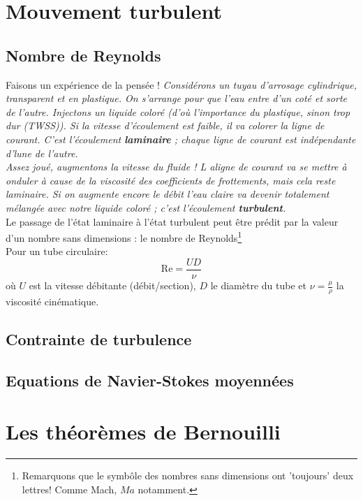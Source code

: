 \section{Mouvement turbulent}
	\subsection{Nombre de Reynolds}
	Faisons un expérience de la pensée ! \textit{Considérons un tuyau d'arrosage cylindrique,
	transparent et en plastique. On s'arrange pour que l'eau entre d'un coté et sorte de l'autre.
	Injectons un liquide coloré (d'où l'importance du plastique, sinon trop dur (TWSS)). Si la
	vitesse d'écoulement est faible, il va colorer la ligne de courant. C'est l'écoulement 
	\textbf{laminaire} ; chaque ligne de courant est indépendante d'lune de l'autre.}\\
	
	\textit{Assez joué, augmentons la vitesse du fluide ! L aligne de courant va se mettre à onduler à
	cause de la viscosité des coefficients de frottements, mais cela reste laminaire. Si on augmente
	encore le débit l'eau claire va devenir totalement mélangée avec notre liquide coloré ; c'est 
	l'écoulement \textbf{turbulent}.}\ \\
	
	Le passage de l'état laminaire à l'état turbulent peut être prédit par la valeur d'un
	nombre sans dimensions : le nombre de Reynolds\footnote{Remarquons que le symbôle des
	nombres sans dimensions ont 'toujours' deux lettres! Comme Mach, $Ma$ notamment.}\\
	Pour un tube circulaire:
	\begin{equation}
	\text{Re} = \frac{UD}{\nu}
	\end{equation}
	où $U$ est la vitesse débitante (débit/section), $D$ le diamètre du tube et $\nu = \frac{
	\mu}{\rho}$ la 	viscosité cinématique.

	
	
	
	
	
	
	
	
	
	
	
	
	
	
	
	
	
	
	
	
	
	
	
	
	
	
	
	
	\subsection{Contrainte de turbulence}
	\subsection{Equations de Navier-Stokes moyennées}
	
\section{Les théorèmes de Bernouilli}